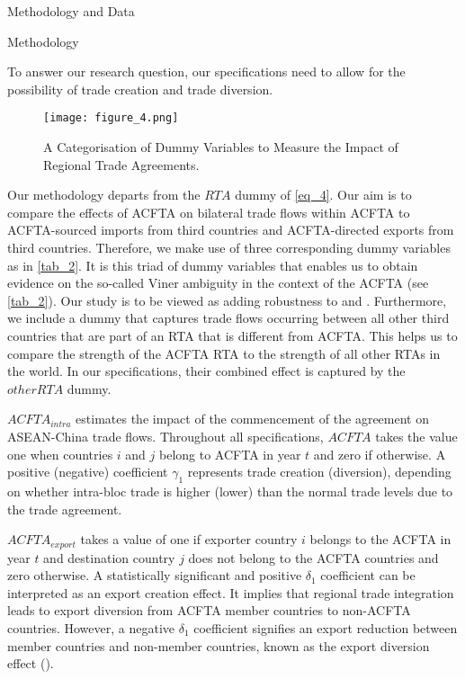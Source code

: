 \begin{section}{Methodology and Data }

\begin{subsection}{Methodology }

To answer our research question, our specifications need to allow for the possibility of trade creation and trade diversion.

\begin{figure}[H]
	\centering
	\texttt{[image: figure\_4.png]}
	\caption{\small{A Categorisation of Dummy Variables to Measure the Impact of Regional Trade Agreements.}}
	\label{fig_4}
\end{figure}

Our methodology departs from the $RTA$ dummy of \autoref{eq_4}. Our aim is to compare the effects of ACFTA on bilateral trade flows within ACFTA to ACFTA-sourced imports from third countries and ACFTA-directed exports from third countries. Therefore, we make use of three corresponding dummy variables as in \autoref{tab_2}. It is this triad of dummy variables that enables us to obtain evidence on the so-called Viner ambiguity in the context of the ACFTA (see \autoref{tab_2}). Our study is to be viewed as adding robustness to \cite{smz2014} and \cite{wla_2021}. Furthermore, we include a dummy that captures trade flows occurring between all other third countries that are part of an RTA that is different from ACFTA. This helps us to compare the strength of the ACFTA RTA to the strength of all other RTAs in the world. In our specifications, their combined effect is captured by the \textbf{$otherRTA$} dummy.

\textbf{\textbf{$ACFTA_{intra}$}} estimates the impact of the commencement of the agreement on ASEAN-China trade flows. Throughout all specifications, $ACFTA$ takes the value one when countries $i$ and $j$ belong to ACFTA in year $t$ and zero if otherwise. A positive (negative) coefficient $\gamma_1$ represents trade creation (diversion), depending on whether intra-bloc trade is higher (lower) than the normal trade levels due to the trade agreement. 

\textbf{\textbf{$ACFTA_{export}$} }takes a value of one if exporter country $i$ belongs to the ACFTA in year $t$ and destination country $j$ does not belong to the ACFTA countries and zero otherwise. A statistically significant and positive $\delta_1$ coefficient can be interpreted as an export creation effect. It implies that regional trade integration leads to export diversion from ACFTA member countries to non-ACFTA countries. However, a negative $\delta_1$ coefficient signifies an export reduction between member countries and non-member countries, known as the export diversion effect (\cite{carrere_2006}). 


\end{subsection}
\end{section}
